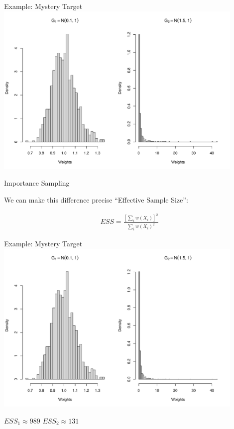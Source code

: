 \documentclass[14pt]{beamer}
\begin{document}
\begin{frame}{Example: Mystery Target}
    \centering
    \includegraphics[height=0.9\textheight, width=0.9\textwidth, keepaspectratio]{Figures/Wt Hist.pdf}
\end{frame}

\begin{frame}{Importance Sampling}
    \begin{outline}
        \1 We can make this difference precise
        \1 ``Effective Sample Size'':
    \end{outline}
    \begin{gather*}
        ESS = \frac{\left[\sum_i w(X_i)\right]^2}{\sum_i w(X_i)^2}
    \end{gather*}
\end{frame}

\begin{frame}{Example: Mystery Target}
    \centering
    \includegraphics[height=0.7\textheight, width=0.9\textwidth, keepaspectratio]{Figures/Wt Hist.pdf} \newline
    \begin{outline}
        $ESS_1 \approx 989$ \hspace{2.5cm} $ESS_2 \approx 131$
    \end{outline}
\end{frame}
\end{document}
